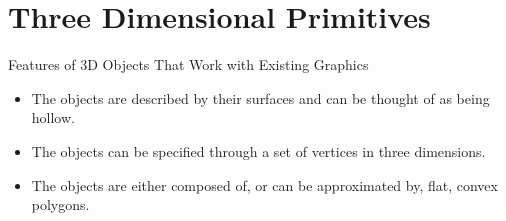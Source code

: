 \documentclass[../COS3712_Notes.tex]{subfiles}
\begin{document}
    \section{Three Dimensional Primitives}
      \begin{sidenote}{Features of 3D Objects That Work with Existing Graphics}
        $ $\vspace{-1em}
        \begin{itemize}
          \item The objects are described by their surfaces and can be thought of as being hollow.
          \item The objects can be specified through a set of vertices in three dimensions.
          \item The objects are either composed of, or can be approximated by, flat, convex polygons.
        \end{itemize}
      \end{sidenote}

    \pagebreak
\end{document}
